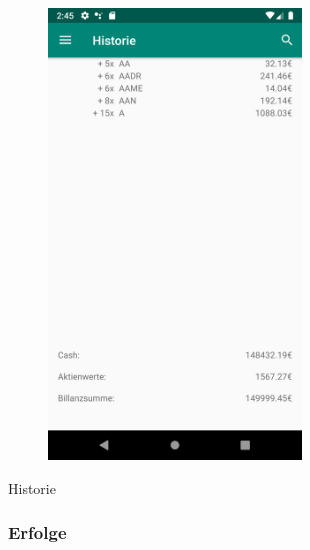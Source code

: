 \documentclass[10pt]{scrartcl}
\begin{document}
\begin{figure}[H]
	\centering
	\includegraphics[width=0.6\textwidth]{Bilder/Applikation/Historie.png}
\end{figure}
Historie

\subsubsection{Erfolge}
\end{document}
